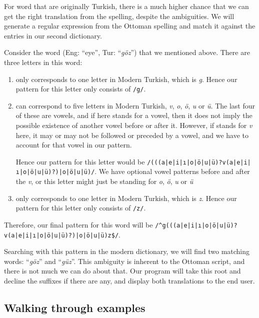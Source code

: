 \documentclass[10pt,twocolumn]{article}
\theoremstyle{nonumberplain}
\newcommand{\otto}[1]{\RLE{\ottoman{}\Large{}#1}}
\newcommand{\word}[1]{``\emph{#1}''}
\begin{document}
For word that are originally Turkish, there is a much higher chance that we can
get the right translation from the spelling, despite the ambiguities.
We will generate a regular expression from the Ottoman spelling and match it
against the entries in our second dictionary.

Consider the word \otto{گوز} (Eng: ``eye'', Tur: \word{göz}) that we mentioned above.
There are three letters in this word: %
\begin{enumerate}[noitemsep,topsep=0pt]
  \item \otto{گ} only corresponds to one letter in Modern Turkish, which is
    \emph{g}. Hence our pattern for this letter only consists of \texttt{/g/}.
  \item \otto{و} can correspond to five letters in Modern Turkish, \emph{v},
    \emph{o}, \emph{ö}, \emph{u} or \emph{ü}. The last four of these are
    vowels, and if \otto{و} here stands for a vowel, then it does not imply the
    possible existence of another vowel before or after it. However, if
    \otto{و} stands for \emph{v} here, it may or may not be followed or
    preceded by a vowel, and we have to account for that vowel in our pattern.

    Hence our pattern for this letter would be
    \texttt{/(((a|e|i|ı|o|ö|u|ü)?v(a|e|i|ı|o|ö|u|ü)?)|o|ö|u|ü)/}.
    We have optional vowel patterns before and after the \emph{v}, or this
    letter might just be standing for \emph{o}, \emph{ö}, \emph{u} or \emph{ü}
\item \otto{ز} only corresponds to one letter in Modern Turkish, which is
    \emph{z}. Hence our pattern for this letter only consists of \texttt{/z/}.
\end{enumerate}

Therefore, our final pattern for this word will be
\texttt{/\^{}g(((a|e|i|ı|o|ö|u|ü)?v(a|e|i|ı|o|ö|u|ü)?)|o|ö|u|ü)z\$/}.

Searching with this pattern in the modern dictionary, we will find two matching
words: \word{göz} and \word{güz}. This ambiguity is inherent to the Ottoman
script, and there is not much we can do about that. Our program will take this
root and decline the suffixes if there are any, and display both translations
to the end user.

\subsection{Walking through examples}
\end{document}
